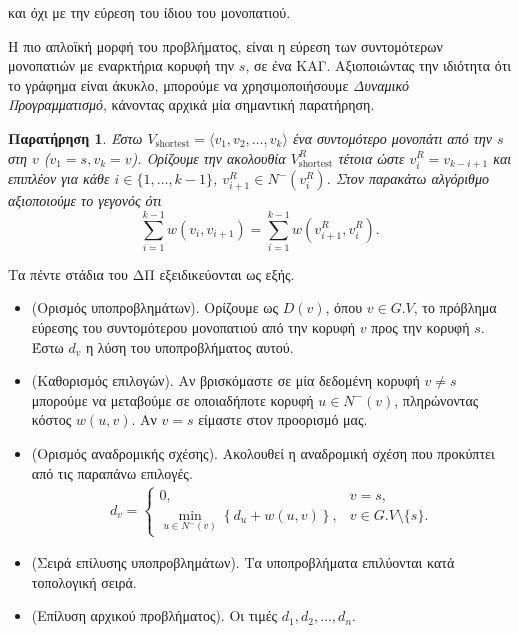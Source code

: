 \documentclass{article}
\newcommand{\sectiontitle}[1]{%
  \vspace{1.5em}%
  \noindent{\Large\bfseries\emph{#1}}\par%
  \vspace{0.5em}%
}
\newtheorem{obs}{Παρατήρηση}
\begin{document}
και όχι με την εύρεση του ίδιου του μονοπατιού.
\newpage
\sectiontitle{Συντομότερα μονοπάτια σε ΚΑΓ}
\noindent
Η πιο απλοϊκή μορφή του προβλήματος, είναι η εύρεση των συντομότερων μονοπατιών με εναρκτήρια κορυφή την $s$, σε ένα ΚΑΓ. Αξιοποιώντας την ιδιότητα
ότι το γράφημα είναι άκυκλο, μπορούμε να χρησιμοποιήσουμε \emph{Δυναμικό Προγραμματισμό}, κάνοντας αρχικά μία σημαντική παρατήρηση. 
\begin{obs}
    Έστω $V_{\text{shortest}} = \langle v_1, v_2, \dots, v_k \rangle$ ένα συντομότερο μονοπάτι από την $s$ στη $v$ ($v_1 = s, v_k = v$). Ορίζουμε την ακολουθία $V^R_{\text{shortest}}$ τέτοια ώστε $v^R_{i} = v_{k - i + 1}$ 
    και επιπλέον για κάθε $i \in \{1, \dots, k - 1\}$, $v^R_{i + 1} \in N^-\left(v^R_i\right)$. Στον παρακάτω αλγόριθμο αξιοποιούμε το γεγονός ότι 
    \begin{equation*}
        \sum_{i = 1}^{k - 1} w(v_i, v_{i + 1}) = \sum_{i = 1}^{k - 1} w\left(v^R_{i + 1},  v^R_{i}\right).
    \end{equation*}
    \label{rev}
\end{obs}
\noindent
Τα πέντε στάδια του ΔΠ εξειδικεύονται ως εξής. 
\begin{itemize}
    \item (Ορισμός υποπροβλημάτων). Ορίζουμε ως $D(v)$, όπου $v \in G.V$, το πρόβλημα εύρεσης του συντομότερου μονοπατιού από την κορυφή $v$ προς την κορυφή $s$. 
    Έστω $d_v$ η λύση του υποπροβλήματος αυτού.
    \item (Καθορισμός επιλογών). Αν βρισκόμαστε σε μία δεδομένη κορυφή $v \neq s$ μπορούμε να μεταβούμε σε οποιαδήποτε κορυφή $u \in N^-(v)$, πληρώνοντας
    κόστος $w(u, v)$. Αν $v = s$ είμαστε στον προορισμό μας. 
    \item  (Ορισμός αναδρομικής σχέσης). Ακολουθεί η αναδρομική σχέση που προκύπτει από τις παραπάνω επιλογές.
    \begin{align*}
        d_v = 
        \begin{cases}
            0, & v = s, \\
            \min_{u \in N^-(v)}\left\{d_u + w(u, v)\right\}, & v \in G.V \setminus \{s\}.
        \end{cases}
    \end{align*}
    \item  (Σειρά επίλυσης υποπροβλημάτων). Τα υποπροβλήματα επιλύονται κατά τοπολογική σειρά.
    \item (Επίλυση αρχικού προβλήματος). Οι τιμές $d_1, d_2, \dots, d_n$. 
\end{itemize}
\end{document}
